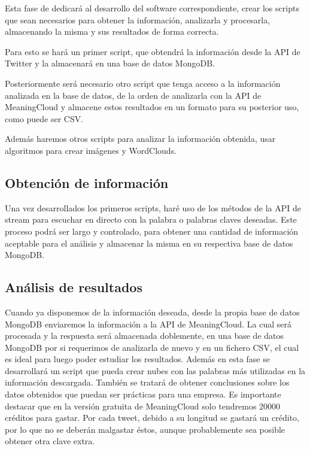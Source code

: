Esta fase de dedicará al desarrollo del software correspondiente, crear los scripts que sean necesarios para obtener la información, analizarla y procesarla, almacenando la misma y sus resultados de forma correcta.

Para esto se hará un primer script, que obtendrá la información desde la API de Twitter y la almacenará en una base de datos MongoDB. 

Posteriormente será necesario otro script que tenga acceso a la información analizada en la base de datos, de la orden de analizarla con la API de MeaningCloud y almacene estos resultados en un formato para su posterior uso, como puede ser CSV. 

Además haremos otros scripts para analizar la información obtenida, usar algoritmos para crear imágenes y WordClouds.  

\subsection{Obtención de información}

Una vez desarrollados los primeros scripts, haré uso de los métodos de la API de stream para escuchar en directo con la palabra o palabras claves deseadas. Este proceso podrá ser largo y controlado, para obtener una cantidad de información aceptable para el análisis y almacenar la misma en su respectiva base de datos MongoDB. 

\subsection{Análisis de resultados}

Cuando ya disponemos de la información deseada, desde la propia base de datos MongoDB enviaremos la información a la API de MeaningCloud. La cual será procesada y la respuesta será almacenada doblemente, en una base de datos MongoDB por si requerimos de analizarla de nuevo y en un fichero CSV, el cual es ideal para luego poder estudiar los resultados. Además en esta fase se desarrollará un script que pueda crear nubes con las palabras más utilizadas en la información descargada. También se tratará de obtener conclusiones sobre los datos obtenidos que puedan ser prácticas para una empresa. 
Es importante destacar que en la versión gratuita de MeaningCloud solo tendremos 20000 créditos para gastar. Por cada tweet, debido a su longitud se gastará un crédito, por lo que no se deberán malgastar éstos, aunque probablemente sea posible obtener otra clave extra. 




